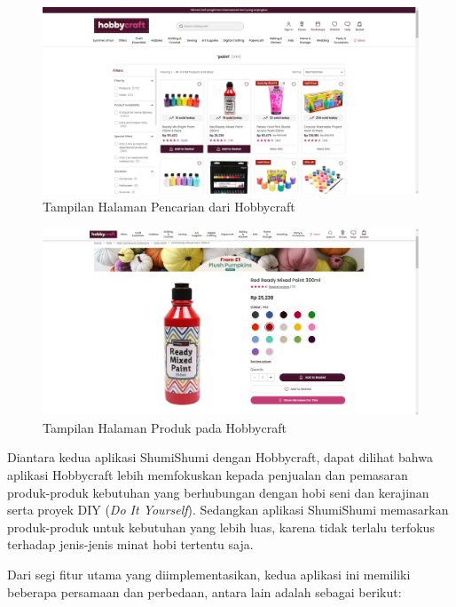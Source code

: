 \documentclass[a4paper]{article}
\begin{document}
\begin{itemize}
\begin{enumerate}
        \begin{figure}[h]
            \centering
            \includegraphics[scale=0.25]{images/ss hobbycraft/Search Page Hobbycraft.png}
            \caption{Tampilan Halaman Pencarian dari Hobbycraft}
        \end{figure}
        \newpage
        \begin{figure}[h]
            \centering
            \includegraphics[scale=0.25]{images/ss hobbycraft/Products Page Hobbycraft.png}
            \caption{Tampilan Halaman Produk pada Hobbycraft}
        \end{figure}

        Diantara kedua aplikasi ShumiShumi dengan Hobbycraft, dapat dilihat bahwa aplikasi Hobbycraft lebih memfokuskan kepada penjualan dan pemasaran produk-produk kebutuhan yang berhubungan dengan hobi seni dan kerajinan serta proyek DIY (\textit{Do It Yourself}). Sedangkan aplikasi ShumiShumi memasarkan produk-produk untuk kebutuhan yang lebih luas, karena tidak terlalu terfokus terhadap jenis-jenis minat hobi tertentu saja.

        Dari segi fitur utama yang diimplementasikan, kedua aplikasi ini memiliki beberapa persamaan dan perbedaan, antara lain adalah sebagai berikut:


\end{enumerate}
\end{itemize}
\end{document}
